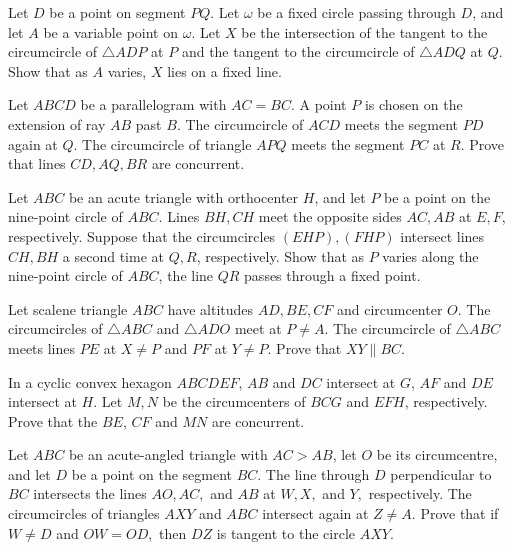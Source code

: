 \documentclass[11pt]{scrartcl}
\begin{document}
\begin{problem}[8152181601565653036]
Let \(D\) be a point on segment \(PQ\). Let \(\omega\) be a fixed circle passing through \(D\), and let \(A\) be a variable point on \(\omega\). Let \(X\) be the intersection of the tangent to the circumcircle of \(\triangle ADP\) at \(P\) and the tangent to the circumcircle of \(\triangle ADQ\) at \(Q\). Show that as \(A\) varies, \(X\) lies on a fixed line.
\end{problem}
\begin{problem}[4389998719836463980]
Let $ABCD$ be a parallelogram with $AC=BC.$ A point $P$ is chosen on the extension of ray $AB$ past $B.$ The circumcircle of $ACD$ meets the segment $PD$ again at $Q.$ The circumcircle of triangle $APQ$ meets the segment $PC$ at $R.$ Prove that lines $CD,AQ,BR$ are concurrent.
\end{problem}
\begin{problem}[8255863576892581507]
	Let $ABC$ be an acute triangle with orthocenter $H$, and let $P$ be a point on the nine-point circle of $ABC$. Lines $BH, CH$ meet the opposite sides $AC, AB$ at $E, F$, respectively. Suppose that the circumcircles $(EHP), (FHP)$ intersect lines $CH, BH$ a second time at $Q,R$, respectively. Show that as $P$ varies along the nine-point circle of $ABC$, the line $QR$ passes through a fixed point.
\end{problem}
\begin{problem}[9153191064326230951]
Let scalene triangle $ABC$ have altitudes $AD, BE, CF$ and circumcenter $O$. The circumcircles of $\triangle ABC$ and $\triangle ADO$ meet at $P \ne A$. The circumcircle of $\triangle ABC$ meets lines $PE$ at $X \ne P$ and $PF$ at $Y \ne P$. Prove that $XY \parallel BC$.
\end{problem}
\begin{problem}[409530198849693]
In a cyclic convex hexagon $ABCDEF$, $AB$ and $DC$ intersect at $G$, $AF$ and $DE$ intersect at $H$. Let $M, N$ be the circumcenters of $BCG$ and $EFH$, respectively. Prove that the $BE$, $CF$ and $MN$ are concurrent.
\end{problem}
\begin{problem}[282712203118607]
	Let $ABC$ be an acute-angled triangle with $AC > AB$, let $O$ be its circumcentre, and let $D$ be a point on the segment $BC$. The line through $D$ perpendicular to $BC$ intersects the lines $AO, AC,$ and $AB$ at $W, X,$ and $Y,$ respectively. The circumcircles of triangles $AXY$ and $ABC$ intersect again at $Z \ne A$.
Prove that if $W \ne D$ and $OW = OD,$ then $DZ$ is tangent to the circle $AXY.$
\end{problem}
\end{document}
